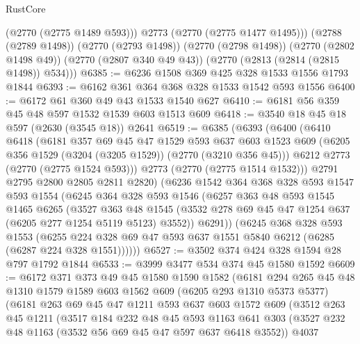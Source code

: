 \begin{lexlean}{RustCore}
\begin{coremodule}
          (@2770 (@2775 @1489 @593)))
        @2773
        (@2770 (@2775 @1477 @1495)))
      (@2788 (@2789 @1498))
      (@2770 (@2793 @1498))
      (@2770 (@2798 @1498))
      (@2770 (@2802 @1498 @49))
      (@2770 (@2807 @340 @49 @43))
      (@2770 (@2813 (@2814 (@2815 @1498)) @534)))
@6385 := @6236 @1508 @369 @425 @328 @1533 @1556 @1793 @1844
@6393 := @6162 @361 @364 @368 @328 @1533 @1542 @593 @1556
@6400 := @6172 @61 @360 @49 @43 @1533 @1540 @627
@6410 := @6181 @56 @359 @45 @48 @597 @1532 @1539 @603 @1513 @609
@6418 := @3540 @18 @45 @18 @597 (@2630 (@3545 @18)) @2641
@6519 := @6385
    (@6393
      (@6400
        (@6410
          @6418
          (@6181
            @357
            @69
            @45
            @47
            @1529
            @593
            @637
            @603
            @1523
            @609
            (@6205 @356 @1529 (@3204 (@3205 @1529)) (@2770 (@3210 @356 @45)))
            @6212
            @2773
            (@2770 (@2775 @1524 @593)))
          @2773
          (@2770 (@2775 @1514 @1532)))
        @2791
        @2795
        @2800
        @2805
        @2811
        @2820)
      (@6236
        @1542
        @364
        @368
        @328
        @593
        @1547
        @593
        @1554
        (@6245
          @364
          @328
          @593
          @1546
          (@6257
            @363
            @48
            @593
            @1545
            @1465
            @6265
            (@3527
              @363
              @48
              @1545
              (@3532 @278 @69 @45 @47 @1254 @637 (@6205 @277 @1254 @5119 @5123) @3552))
            @6291))
        (@6245
          @368
          @328
          @593
          @1553
          (@6255 @224 @328 @69 @47 @593 @637 @1551 @5840 @6212 (@6285 (@6287 @224 @328 @1551))))))
@6527 := @3502 @374 @424 @328 @1594 @28 @797 @1792 @1844
@6533 := @3999 @3477 @534 @374 @45 @1580 @1592
@6609 := @6172
    @371
    @373
    @49
    @45
    @1580
    @1590
    @1582
    (@6181
      @294
      @265
      @45
      @48
      @1310
      @1579
      @1589
      @603
      @1562
      @609
      (@6205 @293 @1310 @5373 @5377)
      (@6181
        @263
        @69
        @45
        @47
        @1211
        @593
        @637
        @603
        @1572
        @609
        (@3512
          @263
          @45
          @1211
          (@3517
            @184
            @232
            @48
            @45
            @593
            @1163
            @641
            @303
            (@3527 @232 @48 @1163 (@3532 @56 @69 @45 @47 @597 @637 @6418 @3552))
            @4037

\end{coremodule}
\end{lexlean}
